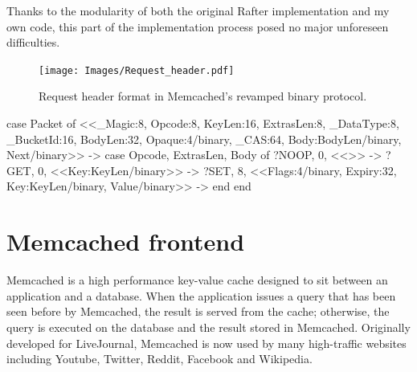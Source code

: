 \documentclass[12pt,chapterprefix=true,toc=bibliography,numbers=noendperiod,
               footnotes=multiple,twoside]{scrreprt}
\begin{document}
Thanks to the modularity of both the original Rafter implementation and my own code, this part of the implementation process posed no major unforeseen difficulties.

\begin{figure}[p]
    \centering
    \texttt{[image: Images/Request\_header.pdf]}
    \caption[Request header format in Memcached's revamped binary protocol]{Request header format in Memcached's revamped binary protocol.
    }
    \label{fig:request-header}
\end{figure}

\begin{listing}[p]
    \begin{erlangcode}
case Packet of
    <<_Magic:8,    Opcode:8,    KeyLen:16,
      ExtrasLen:8, _DataType:8, _BucketId:16,
      BodyLen:32,
      Opaque:4/binary,     %
      _CAS:64,             %
      Body:BodyLen/binary, %
      Next/binary>> ->     %
        case {Opcode, ExtrasLen, Body} of
            {?NOOP, 0, <<>>} ->
            {?GET,  0, <<Key:KeyLen/binary>>} ->
            {?SET,  8, <<Flags:4/binary, Expiry:32, Key:KeyLen/binary,
                         Value/binary>>} ->
        end
end
    \end{erlangcode}
    \caption[Request decoding in Erlang]{Memcached request decoder implementation for the binary protocol described in \cref{fig:request-header}. The structure of the \texttt{case Packet} reflects the structure of the packet header. Note how the variable \texttt{BodyLen} captured in the case statement can be used to specify the size of the \texttt{Body} variable within the same case statement. Variables preceded by an underscore are unused.}
    \label{lst:request-header}
\end{listing}

\section{Memcached frontend}
\label{sc:memcached-frontend}

Memcached is a high performance key-value cache designed to sit between an application and a database. When the application issues a query that has been seen before by Memcached, the result is served from the cache; otherwise, the query is executed on the database and the result stored in Memcached. Originally developed for LiveJournal, Memcached is now used by many high-traffic websites including Youtube, Twitter, Reddit, Facebook and Wikipedia.
\end{document}
